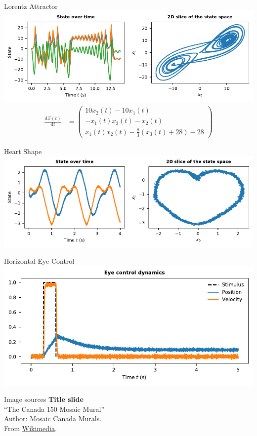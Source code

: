 \documentclass[handout,aspectratio=169]{beamer}
\begin{document}
	\begin{frame}{Lorentz Attractor}
		\centering
		\includegraphics[width=\textwidth]{media/example_lorentz.pdf}
		\begin{align*}
			\frac{\mathrm{d}\vec x(t)}{\mathrm{d}t} &= \begin{pmatrix}
			10 x_2(t)-10x_1(t) \\
			-x_1(t) x_3(t)-x_2(t) \\
			x_1(t) x_2(t) - \frac{8}{3}(x_3(t)+28)-28
			\end{pmatrix}
		\end{align*}
	\end{frame}

	\begin{frame}{Heart Shape}
		\centering
		\includegraphics[width=\textwidth]{media/example_heart.pdf}
	\end{frame}

	\begin{frame}{Horizontal Eye Control}
		\centering
		\includegraphics[width=\textwidth]{media/example_eye_control.pdf}
	\end{frame}

	\backupbegin
	
	\begin{frame}[noframenumbering]{Image sources}
		\small
		\textbf{Title slide}\\\enquote{The Canada 150 Mosaic Mural}\\Author: Mosaic Canada Murals.\\From \href{https://commons.wikimedia.org/wiki/File:Canada_150_Mosaic_Engine.jpg}{Wikimedia}.
	\end{frame}


	\backupend
	
\end{document}
